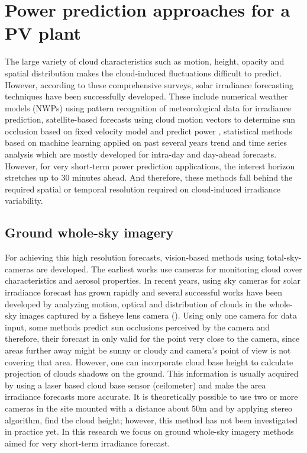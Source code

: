 \section{Power prediction approaches for a PV plant}
\label{sec:overview}
The large variety of cloud characteristics such as motion, height, opacity and spatial distribution makes the cloud-induced fluctuations difficult to predict. However, according to these comprehensive surveys\cite{survay1, survay2}, solar irradiance forecasting techniques have been successfully developed. 
These include numerical weather models (NWPs)\cite{nwp13} using pattern recognition of meteorological data for irradiance prediction, satellite-based forecasts using cloud motion vectors to determine sun occlusion based on fixed velocity model and predict power \cite{sat_based13,sat_based2004, sat_based99}, statistical methods based on machine learning applied on past several years trend\cite{stat_based13} and time series analysis\cite{time_serise09}
which are mostly developed for intra-day and day-ahead forecasts. However, for very short-term power prediction applications, the interest horizon stretches up to 30 minutes ahead. And therefore, these methods fall behind the required spatial or temporal resolution required on cloud-induced irradiance variability\cite{survay1}.

\subsection{Ground whole-sky imagery}
For achieving this high resolution forecasts, vision-based methods using total-sky-cameras are developed. The earliest works use cameras for monitoring cloud cover characteristics\cite{cloud_cover03, cloud_cover08} and aerosol properties\cite{areosal1, areosal2}. In recent years,  using sky cameras for solar irradiance forecast has grown rapidly and several successful works have been developed by analyzing motion, optical and distribution of clouds in the whole-sky images captured by a fisheye lens camera (\cite{cloud_detection_using_RBR, cloud_height14, point_forecast14}).  
Using only one camera for data input, some methods\cite{point_forecast14} predict sun occlusions perceived by the camera and therefore, their forecast in only valid for the point very close to the camera, since areas further away might be sunny or cloudy and camera's point of view is not covering that area. However, one can incorporate cloud base height to calculate projection of clouds shadows on the ground. This information is usually acquired by using a laser based cloud base sensor (ceilometer) and make the area irradiance forecasts  more accurate\cite{cloud_height14}. It is theoretically possible to use two or more cameras in the site mounted with a distance about 50m and by applying stereo algorithm, find the cloud height; however, this method has not been investigated in practice yet. In this research we focus on ground whole-sky imagery methods aimed for very short-term irradiance forecast.

